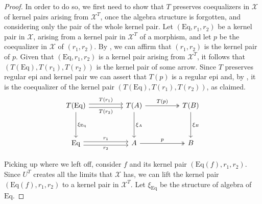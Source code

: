 \begin{subbox}{}
\begin{proof}
        In order to do so, we first need to show that $T$ preserves coequalizers in $\mathcal{X}$ of kernel pairs arising from $\mathcal{X}^T$, once the algebra structure is forgotten, and considering only the pair of the whole kernel pair. Let $(\mathrm{Eq},r_1,r_2)$ be a kernel pair in $\mathcal{X}$, arising from a kernel pair in $\mathcal{X}^T$ of a morphism, and let $p$ be the coequalizer in $\mathcal{X}$ of $(r_1,r_2)$. By , we can affirm that $(r_1,r_2)$ is the kernel pair of $p$. Given that $(\mathrm{Eq},r_1,r_2)$ is a kernel pair arising from $\mathcal{X}^T$, it follows that $(T(\mathrm{Eq}),T(r_1),T(r_2))$ is the kernel pair of some arrow. Since $T$ preserves regular epi and kernel pair we can assert that $T(p)$ is a regular epi and, by , it is the coequalizer of the kernel pair $(T(\mathrm{Eq}),T(r_1),T(r_2))$, as claimed.
        \[
        \begin{tikzcd}
        T(\mathrm{Eq}) \arrow[rr, "T(r_2)"', shift right] \arrow[rr, "T(r_1)", shift left] \arrow[dd, "\xi_\mathrm{Eq}"] &  & T(A) \arrow[dd, "\xi_A"] \arrow[rr, "T(p)", two heads] &  & T(B) \arrow[dd, "\xi_B"] \\
                                                                                                                         &  &                                                        &  &                          \\
        \mathrm{Eq} \arrow[rr, "r_2"', shift right] \arrow[rr, "r_1", shift left]                                        &  & A \arrow[rr, "p", two heads]                           &  & B                       
        \end{tikzcd}
        \]
        
        Picking up where we left off, consider $f$ and its kernel pair $(\mathrm{Eq}(f),r_1,r_2)$. Since $U^T$ creates all the limits that $\mathcal{X}$ has, we can lift the kernel pair $(\mathrm{Eq}(f),r_1,r_2)$ to a kernel pair in $\mathcal{X}^T$. Let $\xi_\mathrm{Eq}$ be the structure of algebra of $\mathrm{Eq}$.


\end{proof}
\end{subbox}
